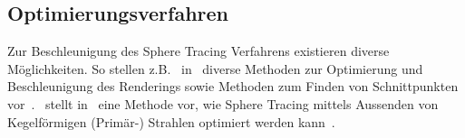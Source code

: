 \subsection{Optimierungsverfahren}
\label{subsec:further_work:optimisation}

Zur Beschleunigung des Sphere Tracing Verfahrens existieren diverse
Möglichkeiten. So stellen z.B.~\citeauthor{keinert_enhanced_2014}
in~ diverse Methoden zur
Optimierung und Beschleunigung des Renderings sowie Methoden zum Finden
von Schnittpunkten vor~\parencite{keinert_enhanced_2014}.~\citeauthor{seven_rendering_2012} stellt
in~ eine Methode vor, wie Sphere Tracing
mittels Aussenden von Kegelförmigen (Primär-) Strahlen optimiert werden
kann~\parencite{seven_rendering_2012}.
